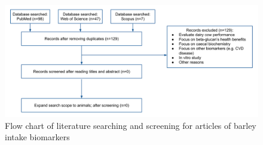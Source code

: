 \begin{figure}[h]
	\centering
	\includegraphics[width=\linewidth]{picture/barley_biomarker_review}
	\caption{Flow chart of literature searching and screening for articles of barley intake biomarkers}
	\label{fig:barleybiomarkerreview}
\end{figure}